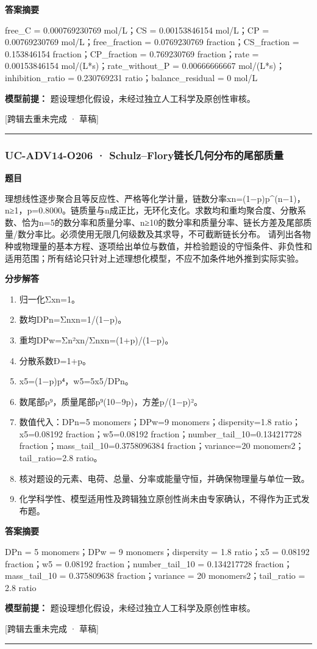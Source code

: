 \documentclass[UTF8,11pt,a4paper]{ctexart}
\begin{document}
\noindent\textbf{答案摘要}\par
free\_C = 0.000769230769 mol/L；CS = 0.00153846154 mol/L；CP = 0.00769230769 mol/L；free\_fraction = 0.0769230769 fraction；CS\_fraction = 0.153846154 fraction；CP\_fraction = 0.769230769 fraction；rate = 0.00153846154 mol/(L*s)；rate\_without\_P = 0.00666666667 mol/(L*s)；inhibition\_ratio = 0.230769231 ratio；balance\_residual = 0 mol/L\par
\noindent\textbf{模型前提：}
题设理想化假设，未经过独立人工科学及原创性审核。\par
\noindent\textcolor{red!65!black}{[跨辑去重未完成 · 草稿]} \par
\medskip\hrule\medskip
{}
\subsubsection*{UC-ADV14-O206 · Schulz–Flory链长几何分布的尾部质量}
\noindent\textbf{题目}\par
理想线性逐步聚合且等反应性、严格等化学计量，链数分率xn=(1−p)p\textasciicircum{}(n−1)，n≥1，p=0.8000。链质量与n成正比，无环化支化。求数均和重均聚合度、分散系数、恰为n=5的数分率和质量分率、n≥10的数分率和质量分率、链长方差及尾部质量/数分率比。必须使用无限几何级数及其求导，不可截断链长分布。 请列出各物种或物理量的基本方程、逐项给出单位与数值，并检验题设的守恒条件、非负性和适用范围；所有结论只针对上述理想化模型，不应不加条件地外推到实际实验。\par
\medskip\noindent\textbf{分步解答}
\begin{enumerate}
\item 归一化Σxn=1。
\item 数均DPn=Σnxn=1/(1−p)。
\item 重均DPw=Σn²xn/Σnxn=(1+p)/(1−p)。
\item 分散系数Đ=1+p。
\item x5=(1−p)p⁴，w5=5x5/DPn。
\item 数尾部p⁹，质量尾部p⁹(10−9p)，方差p/(1−p)²。
\item 数值代入：DPn=5 monomers；DPw=9 monomers；dispersity=1.8 ratio；x5=0.08192 fraction；w5=0.08192 fraction；number\_tail\_10=0.134217728 fraction；mass\_tail\_10=0.3758096384 fraction；variance=20 monomers2；tail\_ratio=2.8 ratio。
\item 核对题设的元素、电荷、总量、分率或能量守恒，并确保物理量与单位一致。
\item 化学科学性、模型适用性及跨辑独立原创性尚未由专家确认，不得作为正式发布题。
\end{enumerate}
\noindent\textbf{答案摘要}\par
DPn = 5 monomers；DPw = 9 monomers；dispersity = 1.8 ratio；x5 = 0.08192 fraction；w5 = 0.08192 fraction；number\_tail\_10 = 0.134217728 fraction；mass\_tail\_10 = 0.375809638 fraction；variance = 20 monomers2；tail\_ratio = 2.8 ratio\par
\noindent\textbf{模型前提：}
题设理想化假设，未经过独立人工科学及原创性审核。\par
\noindent\textcolor{red!65!black}{[跨辑去重未完成 · 草稿]} \par
\medskip\hrule\medskip
{}
\end{document}
